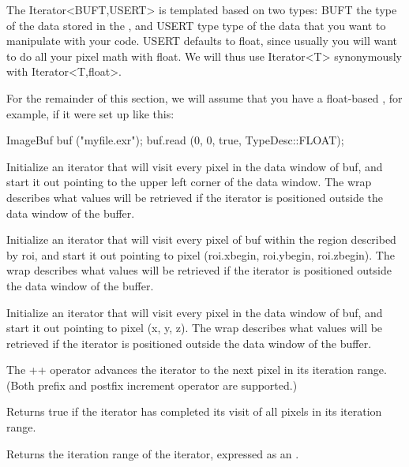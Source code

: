 The {\cf Iterator<BUFT,USERT>} is templated based on two types: {\cf
  BUFT} the type of the data stored in the \ImageBuf, and {\cf USERT}
type type of the data that you want to manipulate with your code.  {\cf
  USERT} defaults to {\cf float}, since usually you will want to do all
your pixel math with {\cf float}.  We will thus use {\cf Iterator<T>}
synonymously with {\cf Iterator<T,float>}.

For the remainder of this section, we will assume that you have a
{\cf float}-based \ImageBuf, for example, if it were set up like this:

\begin{code}
ImageBuf buf ("myfile.exr");
buf.read (0, 0, true, TypeDesc::FLOAT);
\end{code}


Initialize an iterator that will visit every pixel in the data window
of {\cf buf}, and start it out pointing to the upper left corner of
the data window.  The {\cf wrap} describes what values will be retrieved
if the iterator is positioned outside the data window of the buffer.
\apiend

Initialize an iterator that will visit every pixel of {\cf buf} 
within the region
described by {\cf roi}, and start it out pointing to pixel ({\cf roi.xbegin, roi.ybegin, roi.zbegin}).
The {\cf wrap} describes what values will be retrieved
if the iterator is positioned outside the data window of the buffer.
\apiend

Initialize an iterator that will visit every pixel in the data window
of {\cf buf}, and start it out pointing to pixel ({\cf x, y, z}).
The {\cf wrap} describes what values will be retrieved
if the iterator is positioned outside the data window of the buffer.
\apiend

The {\cf ++} operator advances the iterator to the next pixel in its
iteration range.  (Both prefix and postfix increment operator are
supported.)
\apiend

Returns {\cf true} if the iterator has completed its visit of all pixels
in its iteration range.
\apiend

Returns the iteration range of the iterator, expressed as an \ROI.
\apiend

